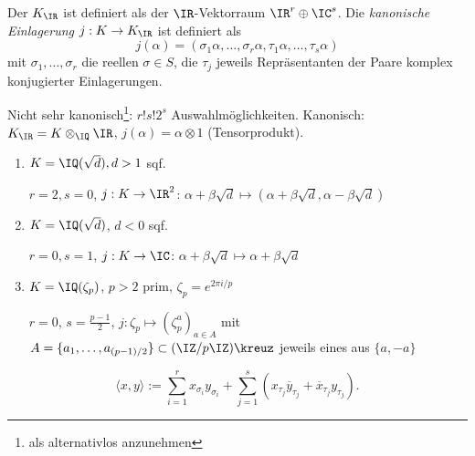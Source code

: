    \begin{Definition}
    Der  $K_{\IR}$ ist definiert als der $\IR$-Vektorraum $\IR^r\oplus \IC^s$. Die \emph{kanonische Einlagerung} $j:K\rightarrow K_{\IR}$ ist definiert als
    \[ j(\alpha)=(\sigma_1\alpha,\ldots,\sigma_r\alpha,\tau_1\alpha,\ldots,\tau_s\alpha) \]
    mit $\sigma_1,\ldots,\sigma_r$ die reellen $\sigma\in S$, die $\tau_j$ jeweils Repräsentanten der Paare komplex konjugierter Einlagerungen.
   \end{Definition}

   \begin{Bemerkung}
   Nicht sehr kanonisch\footnote{\glqq als alternativlos anzunehmen\grqq}: $r!s!2^s$ Auswahlmöglichkeiten. Kanonisch: $K_\IR = K\otimes_{\IQ} \IR$, $j(\alpha)=\alpha\otimes 1$ (Tensorprodukt). 
   \end{Bemerkung}
   
   \begin{Beispiel}
    \begin{enumerate}
     \item $K=\IQ(\sqrt d), d>1$ sqf.
     
     $r=2,s=0$, $j:K\rightarrow\IR^2$: $\alpha+\beta\sqrt d \mapsto (\alpha+\beta\sqrt d, \alpha-\beta\sqrt d)$
     \item $K=\IQ(\sqrt d)$, $d<0$ sqf.
     
     $r=0,s=1$, $j:K\rightarrow\IC$: $\alpha+\beta\sqrt d \mapsto \alpha+\beta\sqrt d$
     \item $K=\IQ(\zeta_p)$, $p>2$ prim, $\zeta_p=e^{2\pi i/p}$
     
     $r=0$, $s=\frac{p-1}{2}$, $j: \zeta_p \mapsto (\zeta_p^a)_{a\in A}$ mit $A = \{ a_1,\ldots,a_{(p-1)/2}\}\subset (\IZ/p\IZ)\kreuz$ jeweils eines aus $\{a,-a \}$
    \end{enumerate}
   \end{Beispiel}
   
   \begin{Definition}
    \[ \langle x,y\rangle:= \sum_{i=1}^r x_{\sigma_i}y_{\sigma_i} + \sum_{j=1}^s(x_{\tau_j}\overline{y}_{\tau_j}+\overline{x}_{\tau_j}y_{\tau_j}).\]
   \end{Definition}

